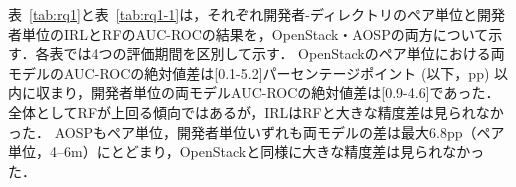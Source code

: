 \documentclass[submit]{ipsj}
\newcommand{\todo}[1]{\colorbox{yellow}{{\bf TODO}:}{\color{red} {\textbf{[#1]}}}}
\begin{document}
表~\ref{tab:rq1}と表~\ref{tab:rq1-1}は，それぞれ開発者-ディレクトリのペア単位と開発者単位のIRLとRFのAUC-ROCの結果を，OpenStack・AOSPの両方について示す．各表では4つの評価期間を区別して示す．
OpenStackのペア単位における両モデルのAUC-ROCの絶対値差は[0.1-5.2]パーセンテージポイント (以下，pp) 以内に収まり，開発者単位の両モデルAUC-ROCの絶対値差は[0.9-4.6]であった．全体としてRFが上回る傾向ではあるが，IRLはRFと大きな精度差は見られなかった．
\noindent AOSPもペア単位，開発者単位いずれも両モデルの差は最大$6.8$pp（ペア単位，4--6m）にとどまり，OpenStackと同様に大きな精度差は見られなかった．


\end{document}
